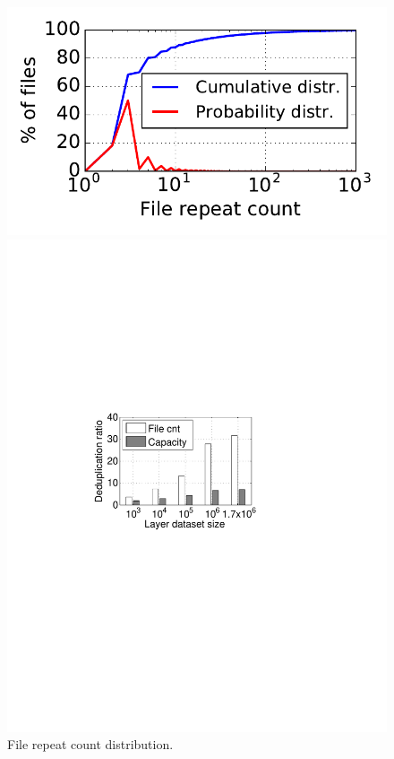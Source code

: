 
\begin{figure}[t]
	\centering
	\begin{minipage}{0.25\textwidth}
		\centering
		\includegraphics[width=1\textwidth]{graphs/File_repeat_count-eps.pdf}
		\caption{File repeat count distribution.
		}
		\label{fig:file-repeat-cnt}
	\end{minipage}
	\begin{minipage}{0.2\textwidth}
		\centering
		\includegraphics[width=1\textwidth]{graphs/dedup-ratio-grow} 

\end{minipage}
\end{figure}
